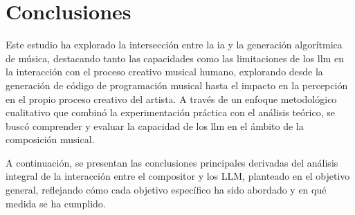 \chapter{Conclusiones}



Este estudio ha explorado la intersección entre la \gls{ia} y la generación algorítmica de música, destacando tanto las capacidades como las limitaciones de los \gls{llm} en la interacción con el proceso creativo musical humano, explorando desde la generación de código de programación musical hasta el impacto en la percepción en el propio proceso creativo del artista. A través de un enfoque metodológico cualitativo que combinó la experimentación práctica con el análisis teórico, se buscó comprender y evaluar la capacidad de los \gls{llm} en el ámbito de la composición musical. 


A continuación, se presentan las conclusiones principales derivadas del análisis integral de la interacción entre el compositor y los LLM, planteado en el objetivo general, reflejando cómo cada objetivo específico ha sido abordado y en qué medida se ha cumplido. 

